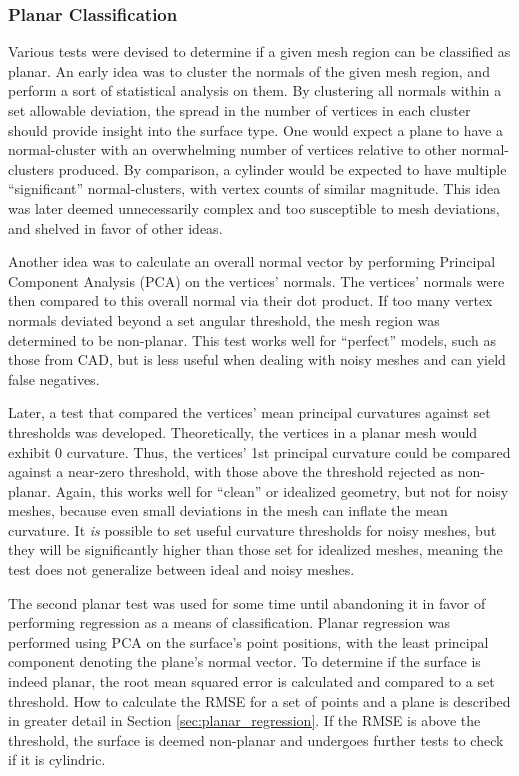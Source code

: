 \subsubsection{Planar Classification}
Various tests were devised to determine if a given mesh region can be classified as planar.
An early idea was to cluster the normals of the given mesh region, and perform a sort of statistical analysis on them.
By clustering all normals within a set allowable deviation, the spread in the number of vertices in each cluster should provide insight into the surface type.
One would expect a plane to have a normal-cluster with an overwhelming number of vertices relative to other normal-clusters produced.
By comparison, a cylinder would be expected to have multiple ``significant'' normal-clusters, with vertex counts of similar magnitude.
This idea was later deemed unnecessarily complex and too susceptible to mesh deviations, and shelved in favor of other ideas.

Another idea was to calculate an overall normal vector by performing Principal Component Analysis (PCA) on the vertices' normals.
The vertices' normals were then compared to this overall normal via their dot product.
If too many vertex normals deviated beyond a set angular threshold, the mesh region was determined to be non-planar.
This test works well for ``perfect'' models, such as those from CAD, but is less useful when dealing with noisy meshes and can yield false negatives.

Later, a test that compared the vertices' mean principal curvatures against set thresholds was developed.
Theoretically, the vertices in a planar mesh would exhibit 0 curvature.
Thus, the vertices' 1st principal curvature could be compared against a near-zero threshold, with those above the threshold rejected as non-planar.
Again, this works well for ``clean'' or idealized geometry, but not for noisy meshes, because even small deviations in the mesh can inflate the mean curvature.
It \textit{is} possible to set useful curvature thresholds for noisy meshes, but they will be significantly higher than those set for idealized meshes, meaning the test does not generalize between ideal and noisy meshes.

The second planar test was used for some time until abandoning it in favor of performing regression as a means of classification.
Planar regression was performed using PCA on the surface's point positions, with the least principal component denoting the plane's normal vector.
To determine if the surface is indeed planar, the root mean squared error is calculated and compared to a set threshold.
How to calculate the RMSE for a set of points and a plane is described in greater detail in Section \ref{sec:planar_regression}.
If the RMSE is above the threshold, the surface is deemed non-planar and undergoes further tests to check if it is cylindric.

